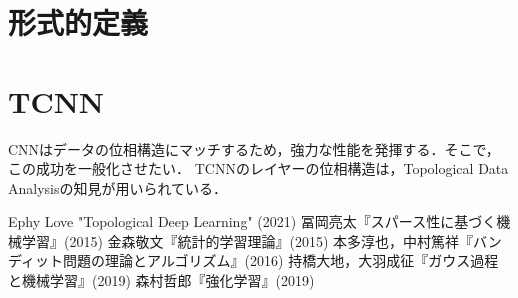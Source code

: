 \documentclass[uplatex,dvipdfmx]{jsreport}
\begin{document}
\section{形式的定義}

\section{TCNN}

\begin{tcolorbox}[colframe=ForestGreen, colback=ForestGreen!10!white,breakable,colbacktitle=ForestGreen!40!white,coltitle=black,fonttitle=\bfseries\sffamily,
title=]
    CNNはデータの位相構造にマッチするため，強力な性能を発揮する．そこで，この成功を一般化させたい．
    TCNNのレイヤーの位相構造は，Topological Data Analysisの知見が用いられている．
\end{tcolorbox}

\begin{thebibliography}{9}
    Ephy Love "Topological Deep Learning" (2021)
    冨岡亮太『スパース性に基づく機械学習』(2015)
    金森敬文『統計的学習理論』(2015)
    本多淳也，中村篤祥『バンディット問題の理論とアルゴリズム』(2016)
    持橋大地，大羽成征『ガウス過程と機械学習』(2019)
    森村哲郎『強化学習』(2019)
\end{thebibliography}
\end{document}
